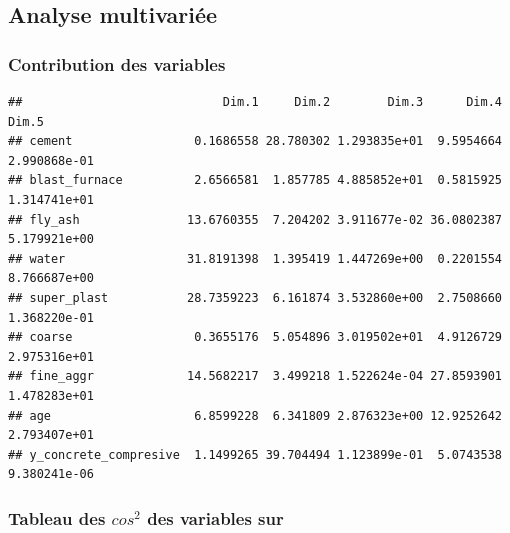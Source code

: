 \documentclass[
  12pt,
]{article}
\newenvironment{Shaded}{\begin{snugshade}}{\end{snugshade}}
\newcommand{\AttributeTok}[1]{\textcolor[rgb]{0.13,0.29,0.53}{#1}}
\newcommand{\CommentTok}[1]{\textcolor[rgb]{0.56,0.35,0.01}{\textit{#1}}}
\newcommand{\FloatTok}[1]{\textcolor[rgb]{0.00,0.00,0.81}{#1}}
\newcommand{\FunctionTok}[1]{\textcolor[rgb]{0.13,0.29,0.53}{\textbf{#1}}}
\newcommand{\NormalTok}[1]{#1}
\newcommand{\OtherTok}[1]{\textcolor[rgb]{0.56,0.35,0.01}{#1}}
\newcommand{\SpecialCharTok}[1]{\textcolor[rgb]{0.81,0.36,0.00}{\textbf{#1}}}
\begin{document}
\subsection{Analyse multivariée}\label{analyse-multivariuxe9e-1}

\subsubsection{Contribution des
variables}\label{contribution-des-variables}

\begin{Shaded}
\end{Shaded}

\begin{verbatim}
##                            Dim.1     Dim.2        Dim.3      Dim.4        Dim.5
## cement                 0.1686558 28.780302 1.293835e+01  9.5954664 2.990868e-01
## blast_furnace          2.6566581  1.857785 4.885852e+01  0.5815925 1.314741e+01
## fly_ash               13.6760355  7.204202 3.911677e-02 36.0802387 5.179921e+00
## water                 31.8191398  1.395419 1.447269e+00  0.2201554 8.766687e+00
## super_plast           28.7359223  6.161874 3.532860e+00  2.7508660 1.368220e-01
## coarse                 0.3655176  5.054896 3.019502e+01  4.9126729 2.975316e+01
## fine_aggr             14.5682217  3.499218 1.522624e-04 27.8593901 1.478283e+01
## age                    6.8599228  6.341809 2.876323e+00 12.9252642 2.793407e+01
## y_concrete_compresive  1.1499265 39.704494 1.123899e-01  5.0743538 9.380241e-06
\end{verbatim}

\subsubsection{\texorpdfstring{Tableau des \(cos^2\) des variables
sur}{Tableau des cos\^{}2 des variables sur}}\label{tableau-des-cos2-des-variables-sur}

\begin{Shaded}
\end{Shaded}
\end{document}
